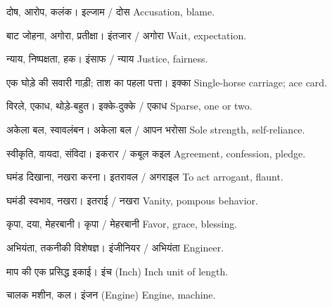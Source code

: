 %
{दोष, आरोप, कलंक।}%
{इल्जाम / दोस}%
{Accusation, blame.}

%
{बाट जोहना, अगोरा, प्रतीक्षा।}%
{इंतजार / अगोरा}%
{Wait, expectation.}

%
{न्याय, निष्पक्षता, हक।}%
{इंसाफ / न्याय}%
{Justice, fairness.}

%
{एक घोड़े की सवारी गाड़ी; ताश का पहला पत्ता।}%
{इक्का}%
{Single-horse carriage; ace card.}

%
{विरले, एकाध, थोड़े-बहुत।}%
{इक्के-दुक्के / एकाध}%
{Sparse, one or two.}

%
{अकेला बल, स्वावलंबन।}%
{अकेला बल / आपन भरोसा}%
{Sole strength, self-reliance.}

%
{स्वीकृति, वायदा, संविदा।}%
{इकरार / कबूल कइल}%
{Agreement, confession, pledge.}

%
{घमंड दिखाना, नखरा करना।}%
{इतरावल / अगराइल}%
{To act arrogant, flaunt.}

%
{घमंडी स्वभाव, नखरा।}%
{इतराई / नखरा}%
{Vanity, pompous behavior.}

%
{कृपा, दया, मेहरबानी।}%
{कृपा / मेहरबानी}%
{Favor, grace, blessing.}

%
{अभियंता, तकनीकी विशेषज्ञ।}%
{इंजीनियर / अभियंता}%
{Engineer.}

%
{माप की एक प्रसिद्ध इकाई।}%
{इंच (Inch)}%
{Inch unit of length.}

%
{चालक मशीन, कल।}%
{इंजन (Engine)}%
{Engine, machine.}

